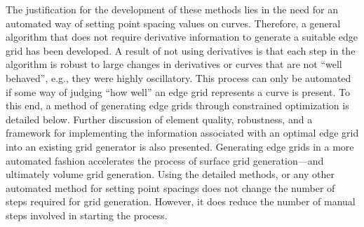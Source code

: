 The justification for the development of these methods lies in the need 
for an automated way of setting point spacing values on curves. Therefore, 
a general algorithm that does not require derivative information to generate a suitable edge grid has been developed. A result of not using derivatives is that each step in the algorithm is robust to large changes in derivatives or curves that are not ``well behaved'', e.g., they were highly oscillatory. This process can only be automated if some way of judging ``how well'' an edge grid represents a curve is present. To this end, a method of generating edge grids through constrained optimization is detailed below. Further discussion of element quality, robustness, and a framework for implementing the information associated with an optimal edge grid into an existing grid generator is also presented. Generating edge grids in a more automated fashion accelerates the process of surface grid generation---and ultimately volume grid generation. Using the detailed methods, or any other automated method for setting point spacings does not change the number of steps required for grid generation. However, it does reduce the number of manual steps involved in starting the process.

